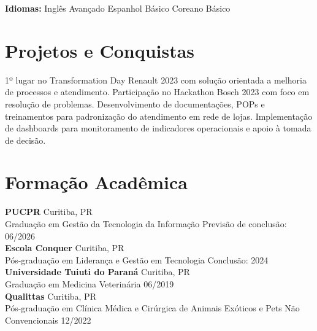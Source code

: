 \documentclass[11pt,a4paper]{article}
\begin{document}
\textbf{Idiomas:} Inglês Avançado \enspace\textbullet\enspace Espanhol Básico \enspace\textbullet\enspace Coreano Básico

\section{Projetos e Conquistas}

1º lugar no Transformation Day Renault 2023 com solução orientada a melhoria de processos e atendimento. Participação no Hackathon Bosch 2023 com foco em resolução de problemas. Desenvolvimento de documentações, POPs e treinamentos para padronização do atendimento em rede de lojas. Implementação de dashboards para monitoramento de indicadores operacionais e apoio à tomada de decisão.

\section{Formação Acadêmica}

\textbf{PUCPR} \hfill Curitiba, PR\\
Graduação em Gestão da Tecnologia da Informação \hfill Previsão de conclusão: 06/2026\\[6pt]

\textbf{Escola Conquer} \hfill Curitiba, PR\\
Pós-graduação em Liderança e Gestão em Tecnologia \hfill Conclusão: 2024\\[6pt]

\textbf{Universidade Tuiuti do Paraná} \hfill Curitiba, PR\\
Graduação em Medicina Veterinária \hfill 06/2019\\[6pt]

\textbf{Qualittas} \hfill Curitiba, PR\\
Pós-graduação em Clínica Médica e Cirúrgica de Animais Exóticos e Pets Não Convencionais \hfill 12/2022
\end{document}
